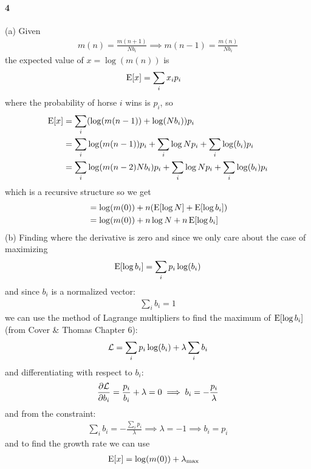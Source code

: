 \documentclass[../main.tex]{subfiles}
\begin{document}
\paragraph*{4} (a) Given
\begin{align*}
    m(n) = \frac{m(n+1)}{N b_i} \implies m(n - 1) = \frac{m(n)}{N b_i}
\end{align*}
the expected value of $x = \log(m(n))$ is
\begin{align*}
    \operatorname{E}[x] &= \sum_i x_i p_i
\end{align*}
where the probability of horse $i$ wins is $p_i$, so 
\begin{align*}
    \operatorname{E}[x] &= \sum_i (\log(m(n - 1)) + \log(N b_i)) p_i \\
    &= \sum_i \log(m(n - 1)) p_i +  \sum_i \log N p_i + \sum_i \log(b_i) p_i \\
    &= \sum_i \log(m(n - 2) N b_i) p_i + \sum_i \log N p_i + \sum_i \log(b_i) p_i
\end{align*}
which is a recursive structure so we get
\begin{align*}
    &= \log(m(0)) + n (\operatorname{E}[\log N] + \operatorname{E}[\log b_i]) \\
    &= \log(m(0)) + n \log N + n \operatorname{E}[\log b_i] 
\end{align*}
(b) Finding where the derivative is zero and since we only care about the case of maximizing
\begin{align*}
    \operatorname{E}[\log b_i] = \sum_i p_i \log(b_i)
\end{align*}
and since $b_i$ is a normalized vector:
\begin{align*}
    \sum_i b_i = 1
\end{align*}
we can use the method of Lagrange multipliers to find the maximum of $\operatorname{E}[\log b_i]$
(from Cover \& Thomas Chapter 6):
\begin{align*}
    \mathcal{L} = \sum_i p_i \log(b_i) + \lambda \sum_i b_i
\end{align*}
and differentiating with respect to $b_i$:
\begin{align*}
    \pdv{\mathcal{L}}{b_i} = \frac{p_i}{b_i} + \lambda = 0 \implies b_i = -\frac{p_i}{\lambda}
\end{align*}
and from the constraint:
\begin{align*}
    \sum_i b_i = -\frac{\sum_i p_i}{\lambda} \implies \lambda = -1 \implies b_i = p_i
\end{align*}
and to find the growth rate we can use
\begin{align*}
    \operatorname{E}[x] &= \log(m(0)) + \lambda_{\text{max}}
\end{align*}
\end{document}
